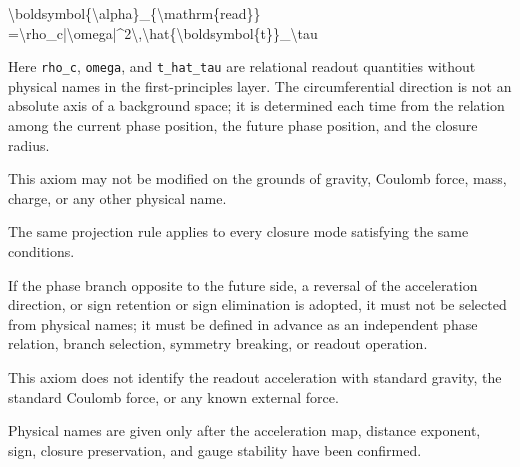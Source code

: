 \documentclass[
  a4paper,
]{article}
\newenvironment{Shaded}{}{}
\newcommand{\NormalTok}[1]{#1}
\begin{document}
\begin{Shaded}
\begin{Highlighting}[]
\NormalTok{\textbackslash{}boldsymbol\{\textbackslash{}alpha\}\_\{\textbackslash{}mathrm\{read\}\}}
\NormalTok{=\textbackslash{}rho\_c|\textbackslash{}omega|\^{}2\textbackslash{},\textbackslash{}hat\{\textbackslash{}boldsymbol\{t\}\}\_\textbackslash{}tau}
\end{Highlighting}
\end{Shaded}

Here \texttt{rho\_c}, \texttt{omega}, and \texttt{t\_hat\_tau} are
relational readout quantities without physical names in the
first-principles layer. The circumferential direction is not an absolute
axis of a background space; it is determined each time from the relation
among the current phase position, the future phase position, and the
closure radius.

This axiom may not be modified on the grounds of gravity, Coulomb force,
mass, charge, or any other physical name.

The same projection rule applies to every closure mode satisfying the
same conditions.

If the phase branch opposite to the future side, a reversal of the
acceleration direction, or sign retention or sign elimination is
adopted, it must not be selected from physical names; it must be defined
in advance as an independent phase relation, branch selection, symmetry
breaking, or readout operation.

This axiom does not identify the readout acceleration with standard
gravity, the standard Coulomb force, or any known external force.

Physical names are given only after the acceleration map, distance
exponent, sign, closure preservation, and gauge stability have been
confirmed.
\end{document}
